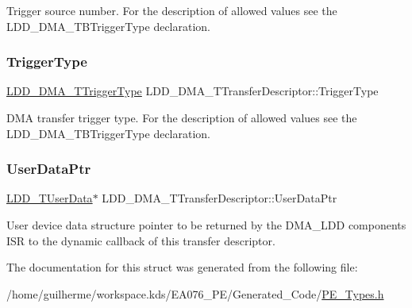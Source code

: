 Trigger source number. For the description of allowed values see the L\+D\+D\+\_\+\+D\+M\+A\+\_\+\+T\+B\+Trigger\+Type declaration. \mbox{\label{struct_l_d_d___d_m_a___t_transfer_descriptor_a1d1ff275b5c883b0cad1b20ef1929716}} 
\subsubsection{\texorpdfstring{Trigger\+Type}{TriggerType}}
{\footnotesize\ttfamily \hyperlink{group___p_e___types__module_ga5590e47d6e7263ae9257e0d231c89521}{L\+D\+D\+\_\+\+D\+M\+A\+\_\+\+T\+Trigger\+Type} L\+D\+D\+\_\+\+D\+M\+A\+\_\+\+T\+Transfer\+Descriptor\+::\+Trigger\+Type}

D\+MA transfer trigger type. For the description of allowed values see the L\+D\+D\+\_\+\+D\+M\+A\+\_\+\+T\+B\+Trigger\+Type declaration. \mbox{\label{struct_l_d_d___d_m_a___t_transfer_descriptor_a4136d6742944c7b04a94695c78b581b8}} 
\subsubsection{\texorpdfstring{User\+Data\+Ptr}{UserDataPtr}}
{\footnotesize\ttfamily \hyperlink{group___p_e___types__module_ga0b66a73f87238a782318aa0be7578e35}{L\+D\+D\+\_\+\+T\+User\+Data}$\ast$ L\+D\+D\+\_\+\+D\+M\+A\+\_\+\+T\+Transfer\+Descriptor\+::\+User\+Data\+Ptr}

User device data structure pointer to be returned by the D\+M\+A\+\_\+\+L\+DD component\textquotesingle{}s I\+SR to the dynamic callback of this transfer descriptor. 

The documentation for this struct was generated from the following file\+:\begin{DoxyCompactItemize}
\item 
/home/guilherme/workspace.\+kds/\+E\+A076\+\_\+\+P\+E/\+Generated\+\_\+\+Code/\hyperlink{_p_e___types_8h}{P\+E\+\_\+\+Types.\+h}\end{DoxyCompactItemize}
